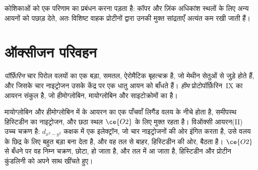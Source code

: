 कोशिकाओं को एक परिणाम का प्रबंधन करना पड़ता है: कॉपर और ज़िंक अधिकांश स्थलों के लिए
अन्य आयनों को पछाड़ देते, अतः विशिष्ट वाहक प्रोटीनों द्वारा उनकी मुक्त सांद्रताएँ
अत्यंत कम रखी जाती हैं।

\section{ऑक्सीजन परिवहन}

\begin{definition}[पॉर्फ़िरिन और हीम]\label{def:b3:bioinorganic:haem}
\emph{पॉर्फ़िरिन} चार पिरोल वलयों का एक बड़ा, समतल, ऐरोमैटिक बृहत्चक्र है,
जो मेथीन सेतुओं से जुड़े होते हैं, और जिसके चार नाइट्रोजन उसके केंद्र पर
एक धातु आयन को बाँधते हैं। \emph{हीम} प्रोटोपॉर्फ़िरिन~IX का आयरन संकुल है,
जो हीमोग्लोबिन, मायोग्लोबिन और साइटोक्रोमों का  है।
\end{definition}

मायोग्लोबिन और हीमोग्लोबिन में  के आयरन का एक पाँचवाँ लिगैंड वलय के नीचे होता है,
समीपस्थ हिस्टिडीन का नाइट्रोजन, और छठा स्थल $\ce{O2}$ के लिए मुक्त रहता है।
विऑक्सी आयरन(II) उच्च चक्रण है: $d_{x^2-y^2}$ कक्षक में एक इलेक्ट्रॉन, जो चार
नाइट्रोजनों की ओर इंगित करता है, उसे वलय के छिद्र के लिए बहुत बड़ा बना देता है, और वह
तल से बाहर, हिस्टिडीन की ओर, बैठता है। $\ce{O2}$ से बँधने पर वह निम्न चक्रण, छोटा, हो जाता है, और
तल में आ जाता है, हिस्टिडीन और प्रोटीन कुंडलिनी को अपने साथ खींचते हुए।

